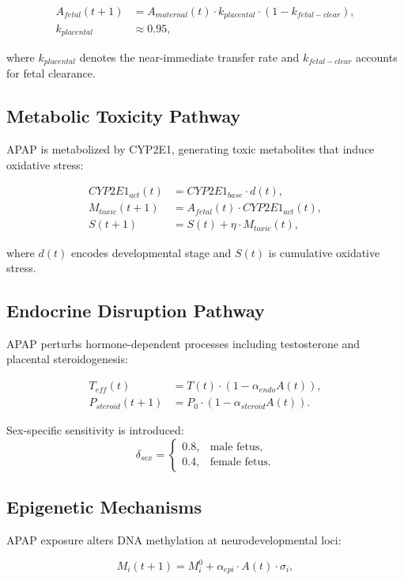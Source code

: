 \documentclass[12pt]{article}
\begin{document}
\begin{align}
A_{fetal}(t+1) &= A_{maternal}(t) \cdot k_{placental} \cdot (1 - k_{fetal-clear}), \\
k_{placental} &\approx 0.95,
\end{align}

where $k_{placental}$ denotes the near-immediate transfer rate and $k_{fetal-clear}$ accounts for fetal clearance.

\subsection{Metabolic Toxicity Pathway}
APAP is metabolized by CYP2E1, generating toxic metabolites that induce oxidative stress:

\begin{align}
CYP2E1_{act}(t) &= CYP2E1_{base} \cdot d(t), \\
M_{toxic}(t+1) &= A_{fetal}(t) \cdot CYP2E1_{act}(t), \\
S(t+1) &= S(t) + \eta \cdot M_{toxic}(t),
\end{align}

where $d(t)$ encodes developmental stage and $S(t)$ is cumulative oxidative stress.

\subsection{Endocrine Disruption Pathway}
APAP perturbs hormone-dependent processes including testosterone and placental steroidogenesis:

\begin{align}
T_{eff}(t) &= T(t) \cdot \left(1 - \alpha_{endo}A(t)\right), \\
P_{steroid}(t+1) &= P_0 \cdot \left(1 - \alpha_{steroid}A(t)\right).
\end{align}

Sex-specific sensitivity is introduced:
\[
\delta_{sex} = \begin{cases}
0.8, & \text{male fetus}, \\
0.4, & \text{female fetus}.
\end{cases}
\]

\subsection{Epigenetic Mechanisms}
APAP exposure alters DNA methylation at neurodevelopmental loci:

\begin{equation}
M_i(t+1) = M_i^0 + \alpha_{epi} \cdot A(t) \cdot \sigma_i,
\end{equation}
\end{document}
